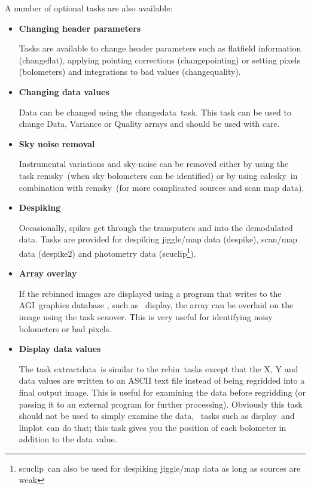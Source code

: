 \documentclass[twoside,11pt]{article}
\newcommand{\Kappa}{\xref{{\sc{Kappa}}}{sun95}{}}
\newcommand{\agi}{\xref{AGI}{sun48}{}}
\newcommand{\task}[1]{{\sf #1}}
\newcommand{\rebin}{\htmlref{\task{rebin}}{REBIN}}
\newcommand{\calcsky}{\htmlref{\task{calcsky}}{CALCSKY}}
\newcommand{\chgqual}{\htmlref{\task{change\_quality}}{CHANGE_QUALITY}}
\newcommand{\chgflat}{\htmlref{\task{change\_flat}}{CHANGE_FLAT}}
\newcommand{\chgpnt}{\htmlref{\task{change\_pointing}}{CHANGE_POINTING}}
\newcommand{\chgdata}{\htmlref{\task{change\_data}}{CHANGE_DATA}}
\newcommand{\remsky}{\htmlref{\task{remsky}}{REMSKY}}
\newcommand{\scuover}{\htmlref{\task{scuover}}{SCUOVER}}
\newcommand{\extdata}{\htmlref{\task{extract\_data}}{EXTRACT_DATA}}
\newcommand{\despike}{\htmlref{\task{despike}}{DESPIKE}}
\newcommand{\despikeb}{\htmlref{\task{despike2}}{DESPIKE2}}
\newcommand{\scuclip}{\htmlref{\task{scuclip}}{SCUCLIP}}
\newcommand{\display}{\xref{\task{display}}{sun95}{DISPLAY}}
\newcommand{\linplot}{\xref{\task{linplot}}{sun95}{LINPLOT}}
\newcommand{\htmlref}[2]{#1}
\newcommand{\xref}[3]{#1}
\renewcommand{\_}{\texttt{\symbol{95}}}
\begin{document}
A number of optional tasks are also available:
\begin{itemize}
\item {\bf Changing header parameters}

Tasks are available to change header parameters such as flatfield
information (\chgflat), applying pointing corrections
(\chgpnt) or setting pixels (bolometers) and integrations to bad
values (\chgqual). 

\item {\bf Changing data values}

Data can be changed using the \chgdata\ task. This task can be used to
change Data, Variance or Quality arrays and should be used with
care. 

\item {\bf Sky noise removal}

Instrumental variations and sky-noise can be removed either by using the task
\remsky\ (when sky bolometers can be identified) or by using \calcsky\ in
combination with \remsky\ (for more complicated sources and scan map data).

\item {\bf Despiking}

Occasionally, spikes get through the transputers and into the demodulated
data. Tasks are provided for despiking jiggle/map data (\despike),
scan/map data (\despikeb) and photometry data (\scuclip\footnote{\scuclip\
can also be used for despiking jiggle/map data as long as sources are weak}).



\item {\bf Array overlay}

If the rebinned images are displayed using a program that writes to the \agi\
graphics database \cite{agi}, such as \Kappa\ \display, the array can be
overlaid on the image using the task \scuover. This is very useful for
identifying noisy bolometers or bad pixels.

\item{\bf Display data values}

The task \extdata\ is similar to the \rebin\ tasks except that the 
X, Y and data values are written to an ASCII text file instead of 
being regridded into a final output image. This is useful for examining
the data before regridding (or passing it to an external program for
further processing). Obviously this task should not be used to simply
examine the data, \Kappa\ tasks such as \display\ and \linplot\
can do that; this task gives you the position of each bolometer in addition
to the data value.

\end{itemize}
\end{document}
